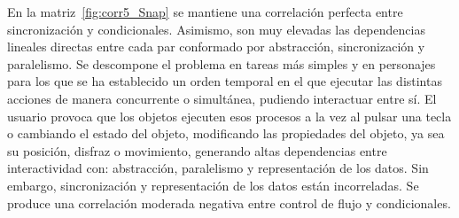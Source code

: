 \documentclass[a4paper, 12pt]{book}
\begin{document}
En la matriz~\ref{fig:corr5_Snap} se mantiene una correlación perfecta entre sincronización y condicionales. Asimismo, son muy elevadas las dependencias lineales directas entre cada par conformado por abstracción, sincronización y paralelismo. Se descompone el problema en tareas más simples y en personajes para los que se ha establecido un orden temporal en el que ejecutar las distintas acciones de manera concurrente o simultánea, pudiendo interactuar entre sí. El usuario provoca que los objetos ejecuten esos procesos a la vez al pulsar una tecla o cambiando el estado del objeto, modificando las propiedades del objeto, ya sea su posición, disfraz o movimiento, generando altas dependencias entre interactividad con: abstracción, paralelismo y representación de los datos. Sin embargo, sincronización y representación de los datos están incorreladas. Se produce una correlación moderada negativa entre control de flujo y condicionales. 
\end{document}
